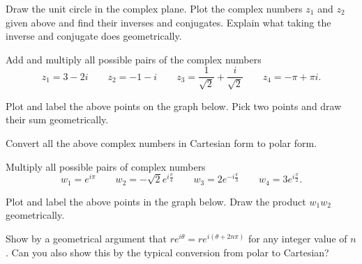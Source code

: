 \begin{problem}
Draw the unit circle in the complex plane. Plot the complex numbers $z_1$ and $z_2$ given above and find their inverses and conjugates. Explain what taking the inverse and conjugate does geometrically.
\end{problem}

\begin{problem}
Add and multiply all possible pairs of the complex numbers
\[
z_1 = 3-2i \qquad z_2 = -1-i \qquad z_3 = \frac{1}{\sqrt{2}}+\frac{i}{\sqrt{2}} \qquad z_4 = -\pi + \pi i.
\]
\end{problem}

\begin{problem}
Plot and label the above points on the graph below. Pick two points and draw their sum geometrically.
        \begin{center}
        \end{center}
\end{problem}

\begin{problem}
Convert all the above complex numbers in Cartesian form to polar form.
\end{problem}

\begin{problem}
Multiply all possible pairs of complex numbers
\[
w_1 = e^{i\pi} \qquad w_2 = -\sqrt{2} e^{i\frac{\pi}{4}} \qquad w_3 = 2 e^{-i\frac{\pi}{3}} \qquad w_4= 3 e^{i\frac{\pi}{2}}.
\]
\end{problem}

\begin{problem}
Plot and label the above points in the graph below.  Draw the product $w_1w_2$ geometrically.
        \begin{center}
        \end{center}
\end{problem}
\newpage

\begin{problem}
Show by a geometrical argument that $re^{i\theta}=re^{i(\theta+2n\pi)}$ for any integer value of $n$.  Can you also show this by the typical conversion from polar to Cartesian?
\end{problem}

